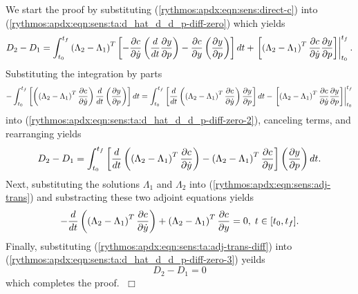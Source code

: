 \documentclass[pdf,ps2pdf,11pt]{SANDreport}
\begin{document}
We start the proof by substituting (\ref{rythmos:apdx:eqn:sens:direct-c}) into
(\ref{rythmos:apdx:eqn:sens:ta:d_hat_d_d_p-diff-zero}) which yields
%
\begin{equation}
D_2 - D_1 = 
\int_{t_0}^{t_f} \left( \Lambda_2 - \Lambda_1 \right)^T \left[
  - \displaystyle{\frac{\partial c}{\partial \dot{y}}} \left(\frac{d}{dt} \displaystyle{\frac{\partial y}{\partial p}} \right) - \displaystyle{\frac{\partial c}{\partial y}} \left(\displaystyle{\frac{\partial y}{\partial p}}\right) \right] dt
+ \left.\left[ \left( \Lambda_2 - \Lambda_1 \right)^T \displaystyle{\frac{\partial c}{\partial \dot{y}}} \displaystyle{\frac{\partial y}{\partial p}} \right]\right|_{t_0}^{t_f}.
\label{rythmos:apdx:eqn:sens:ta:d_hat_d_d_p-diff-zero-2}
\end{equation}
%
Substituting the integration by parts
%
\[
- \int_{t_0}^{t_f} \left[ \left( \left( \Lambda_2 - \Lambda_1 \right)^T \displaystyle{\frac{\partial c}{\partial \dot{y}}} \right) \frac{d}{dt}\left( \displaystyle{\frac{\partial y}{\partial p}} \right) \right] dt
= \int_{t_0}^{t_f} \left[ \frac{d}{dt}\left( \left( \Lambda_2 - \Lambda_1 \right)^T  \displaystyle{\frac{\partial c}{\partial \dot{y}}} \right) \displaystyle{\frac{\partial y}{\partial p}} \right] dt
- \left. \left[ \left( \Lambda_2 - \Lambda_1 \right)^T  \displaystyle{\frac{\partial c}{\partial \dot{y}}} \displaystyle{\frac{\partial y}{\partial p}} \right] \right|_{t_0}^{t_f}
\]
%
into (\ref{rythmos:apdx:eqn:sens:ta:d_hat_d_d_p-diff-zero-2}), canceling
terms, and rearranging yields
%
\begin{equation}
D_2 - D_1 = 
\int_{t_0}^{t_f} \left[ \frac{d}{dt} \left( \left( \Lambda_2 - \Lambda_1 \right)^T \displaystyle{\frac{\partial c}{\partial \dot{y}}} \right)
- \left( \Lambda_2 - \Lambda_1 \right)^T \displaystyle{\frac{\partial c}{\partial y}} \right] \left(\displaystyle{\frac{\partial y}{\partial p}}\right) dt.
\label{rythmos:apdx:eqn:sens:ta:d_hat_d_d_p-diff-zero-3}
\end{equation}
%
Next, substituting the solutions $\Lambda_1$ and $\Lambda_2$ into
(\ref{rythmos:apdx:eqn:sens:adj-trans}) and substracting these two adjoint
equations yields
%
\begin{equation}
- \frac{d}{dt} \left( \left( \Lambda_2 - \Lambda_1 \right)^T \displaystyle{\frac{\partial c}{\partial \dot{y}}} \right)
+ \left( \Lambda_2 - \Lambda_1 \right)^T \displaystyle{\frac{\partial c}{\partial y}} = 0, \; t \in [t_0,t_f].
\label{rythmos:apdx:eqn:sens:ta:adj-trans-diff}
\end{equation}
%
Finally, substituting (\ref{rythmos:apdx:eqn:sens:ta:adj-trans-diff}) into
(\ref{rythmos:apdx:eqn:sens:ta:d_hat_d_d_p-diff-zero-3}) yeilds
%
\begin{equation}
D_2 - D_1 = 0
\label{rythmos:apdx:eqn:sens:ta:d_hat_d_d_p-diff-zero-final}
\end{equation}
%
which completes the proof. $\;\Box$
\end{document}
